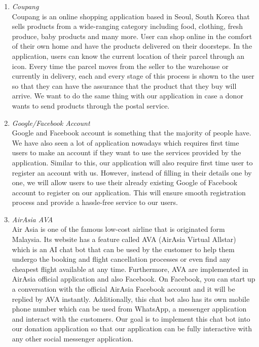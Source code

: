 \documentclass[conference]{IEEEtran}
\begin{document}
\begin{enumerate}
\item \textit{Coupang }\\
Coupang is an online shopping application based in Seoul, South Korea that sells products from a wide-ranging category including food, clothing, fresh produce, baby products and many more. User can shop online in the comfort of their own home and have the products delivered on their doorsteps. In the application, users can know the current location of their parcel through an icon. Every time the parcel moves from the seller to the warehouse or currently in delivery, each and every stage of this process is shown to the user so that they can have the assurance that the product that they buy will arrive. We want to do the same thing with our application in case a donor wants to send products through the postal service. \\
\item \textit{Google/Facebook Account}\\
Google and Facebook account is something that the majority of people have. We have also seen a lot of application nowadays which requires first time users to make an account if they want to use the services provided by the application. Similar to this, our application will also require first time user to register an account with us. However, instead of filling in their details one by one, we will allow users to use their already existing Google of Facebook account to register on our application. This will ensure smooth registration process and provide a hassle-free service to our users.\\
\item \textit{AirAsia AVA} \\
Air Asia is one of the famous low-cost airline that is originated form Malaysia. Its website has a feature called AVA (AirAsia Virtual Allstar) which is an AI chat bot that can be used by the customer to help them undergo the booking and flight cancellation processes or even find any cheapest flight available at any time. Furthermore, AVA are implemented in AirAsia official application and also Facebook. On Facebook, you can start up a conversation with the official AirAsia Facebook account and it will be replied by AVA instantly. Additionally, this chat bot also has its own mobile phone number which can be used from WhatsApp, a messenger application and interact with the customers. Our goal is to implement this chat bot into our donation application so that our application can be fully interactive with any other social messenger application.\\

\end{enumerate}
\end{document}
